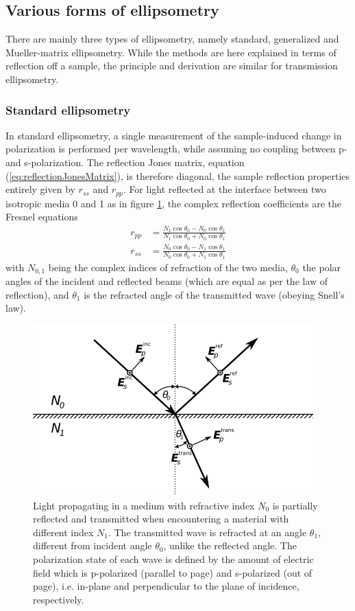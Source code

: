 \subsection{Various forms of ellipsometry}
There are mainly three types of ellipsometry, namely standard, generalized and Mueller-matrix ellipsometry. While the methods are here explained in terms of reflection off a sample, the principle and derivation are similar for transmission ellipsometry\cite{handbook_ellipsometry_ch1}.

\subsubsection{Standard ellipsometry}
In standard ellipsometry, a single measurement of the sample-induced change in polarization is performed per wavelength, while assuming no coupling between p- and s-polarization. The reflection Jones matrix, equation (\ref{eq:reflectionJonesMatrix}), is therefore diagonal, the sample reflection properties entirely given by $r_{ss}$ and $r_{pp}$. For light reflected at the interface between two isotropic media 0 and 1 as in figure \ref{fig:SE}, the complex reflection coefficients are the Fresnel equations\cite{azzam}
\begin{subequations}
\begin{align}
    r_{pp} &= \frac{N_1\cos\theta_0 - N_0\cos\theta_1}{N_1\cos\theta_0 + N_0\cos\theta_1}    \\
    r_{ss} &= \frac{N_0\cos\theta_0 - N_1\cos\theta_1}{N_0\cos\theta_0 + N_1\cos\theta_1}
\end{align}
\label{eq:Fresnel_refl_coeff}
\end{subequations}
with $N_{0,1}$ being the complex indices of refraction of the two media, $\theta_0$ the polar angles of the incident and reflected beams (which are equal as per the law of reflection), and $\theta_1$ is the refracted angle of the transmitted wave (obeying Snell's law)\cite{griffiths}.
\begin{figure}
    \centering
    \includegraphics[scale=0.8]{figures/Ch2/SE.png}
    \caption{Light propagating in a medium with refractive index $N_0$ is partially reflected and transmitted when encountering a material with different index $N_1$. The transmitted wave is refracted at an angle $\theta_1$, different from incident angle $\theta_0$, unlike the reflected angle. The polarization state of each wave is defined by the 
    amount of electric field which is p-polarized (parallel to page) and s-polarized (out of page), i.e. in-plane and perpendicular to the plane of incidence, respectively.}
    \label{fig:SE}
\end{figure}
